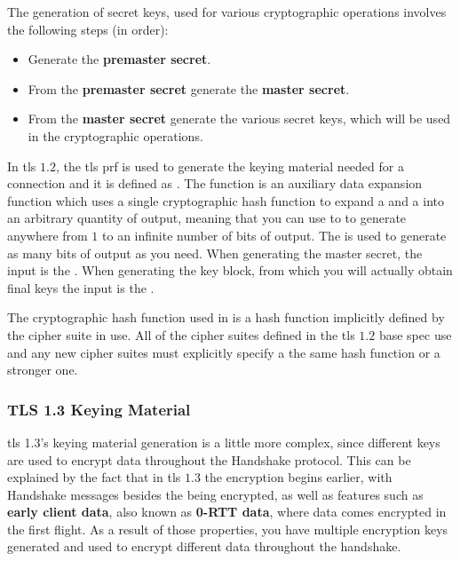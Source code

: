 \documentclass{llncs}
\begin{document}
The generation of secret keys, used for various cryptographic operations involves the
following steps (in order):

\begin{itemize}
  \item Generate the \textbf{premaster secret}.
  \item From the \textbf{premaster secret} generate the \textbf{master secret}.
  \item From the \textbf{master secret} generate the various secret keys, which
  will be used in the cryptographic operations.
\end{itemize}

In \gls{tls} $1.2$, the \gls{tls} \gls{prf} is used to generate the keying material
needed for a connection and it is defined as .
The  function is an auxiliary data expansion function
which uses a single cryptographic hash function to expand a  and a 
into an arbitrary quantity of output, meaning that you can use to to generate
anywhere from $1$ to an infinite number of bits of output. The 
is used to generate as many bits of output as you need. When generating the
master secret, the  input is the .
When generating the key block, from which you will actually obtain final keys
the  input is the .

The cryptographic hash function used in  is
a hash function implicitly defined by the cipher suite in use. All of the cipher
suites defined in the \gls{tls} $1.2$ base spec use  and any new
cipher suites must explicitly specify a the same hash function or a stronger one.

\subsubsection{TLS 1.3 Keying Material}

\gls{tls} 1.3's keying material generation is a little more complex, since different
keys are used to encrypt data throughout the Handshake protocol. This can be
explained by the fact that in \gls{tls} $1.3$ the encryption begins earlier, with
Handshake messages besides the  being encrypted,
as well as features such as \textbf{early client data}, also known as \textbf{0-RTT data},
where data comes encrypted in the first flight. As a result of those properties,
you have multiple encryption keys generated and used to encrypt different data
throughout the handshake.
\end{document}
